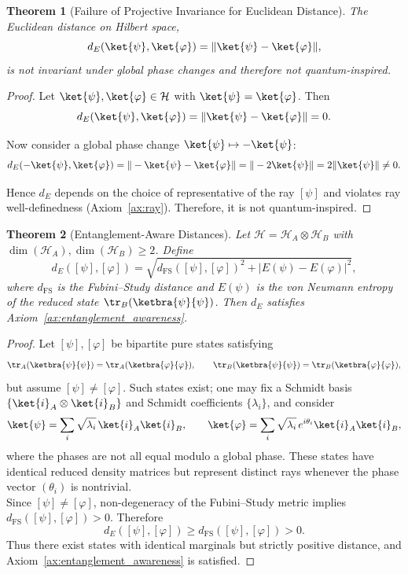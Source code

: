 \documentclass[aps,pra,reprint,nofootinbib,showpacs,superscriptaddress]{revtex4-1}
\newtheorem{theorem}{Theorem}[section]
\newcommand{\Hilbert}{\mathcal{H}}
\begin{document}
\begin{theorem}[Failure of Projective Invariance for Euclidean Distance]
The Euclidean distance on Hilbert space,
\[
d_E(\ket{\psi},\ket{\varphi}) = \|\ket{\psi} - \ket{\varphi}\|,
\]
is not invariant under global phase changes and therefore not quantum-inspired.
\end{theorem}

\begin{proof}
Let $\ket{\psi},\ket{\varphi} \in \Hilbert$ with $\ket{\psi} = \ket{\varphi}$. Then
\[
d_E(\ket{\psi},\ket{\varphi}) = \|\ket{\psi}-\ket{\varphi}\| = 0.
\]

Now consider a global phase change $\ket{\psi} \mapsto -\ket{\psi}$:
\[
d_E(-\ket{\psi},\ket{\varphi}) = \| -\ket{\psi}-\ket{\varphi}\| = \|-2\ket{\psi}\| = 2 \|\ket{\psi}\| \neq 0.
\]

Hence $d_E$ depends on the choice of representative of the ray $[\psi]$ and violates ray well-definedness (Axiom~\ref{ax:ray}). Therefore, it is not quantum-inspired.
\end{proof}


\begin{theorem}[Entanglement-Aware Distances]
Let $\Hilbert = \Hilbert_A \otimes \Hilbert_B$ with 
$\dim(\Hilbert_A),\dim(\Hilbert_B)\ge 2$. Define
\[
d_E([\psi],[\varphi]) 
= \sqrt{d_{\mathrm{FS}}([\psi],[\varphi])^2 
+ |E(\psi)-E(\varphi)|^2},
\]
where $d_{\mathrm{FS}}$ is the Fubini--Study distance and 
$E(\psi)$ is the von Neumann entropy of the reduced state 
$\tr_B(\ketbra{\psi}{\psi})$. 
Then $d_E$ satisfies Axiom~\ref{ax:entanglement_awareness}.
\end{theorem}

\begin{proof}
Let $[\psi],[\varphi]$ be bipartite pure states satisfying
\[
\tr_A(\ketbra{\psi}{\psi}) 
= 
\tr_A(\ketbra{\varphi}{\varphi}),
\qquad
\tr_B(\ketbra{\psi}{\psi}) 
= 
\tr_B(\ketbra{\varphi}{\varphi}),
\]
but assume $[\psi] \neq [\varphi]$. Such states exist; one may fix a Schmidt basis 
$\{\ket{i}_A \otimes \ket{i}_B\}$ and Schmidt coefficients 
$\{\lambda_i\}$, and consider
\[
\ket{\psi} = \sum_i \sqrt{\lambda_i}\,\ket{i}_A\ket{i}_B,
\qquad
\ket{\varphi} = \sum_i \sqrt{\lambda_i}\,e^{i\theta_i}
\ket{i}_A\ket{i}_B,
\]
where the phases are not all equal modulo a global phase.
These states have identical reduced density matrices but 
represent distinct rays whenever the phase vector 
$(\theta_i)$ is nontrivial.\\
Since $[\psi] \neq [\varphi]$, non-degeneracy of the 
Fubini--Study metric implies
\(
d_{\mathrm{FS}}([\psi],[\varphi]) > 0.
\)
Therefore
\[
d_E([\psi],[\varphi]) 
\ge d_{\mathrm{FS}}([\psi],[\varphi]) 
> 0.
\]
Thus there exist states with identical marginals but strictly positive distance, and Axiom~\ref{ax:entanglement_awareness} is satisfied.
\end{proof}
\end{document}
